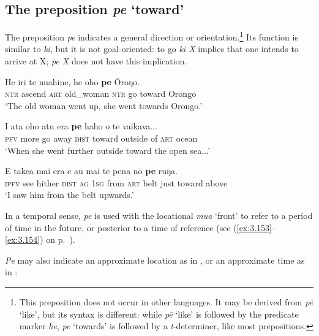 \subsection{The preposition \textit{pe} ‘toward’}\label{sec:4.7.5}

The preposition \textit{pe} indicates a general direction or orientation.\footnote{\label{fn:231}This preposition does not occur in other languages. It may be derived from \textit{pē} ‘like’, but its syntax is different: while \textit{pē} ‘like’ is followed by the predicate marker \textit{he}, \textit{pe} ‘towards’ is followed by a \textit{t}{}-determiner, like most prepositions.} Its function is similar to \textit{ki}, but it is not goal-oriented: to go \textit{ki X} implies that one intends to arrive at X; \textit{pe X} does not have this implication.

\ea\label{ex:4.273}
\gll He iri te nuahine, he oho \textbf{pe} {\ꞌ}Ōroŋo. \\
\textsc{ntr} ascend \textsc{art} old\_woman \textsc{ntr} go toward Orongo \\

\glt 
‘The old woman went up, she went towards Orongo.’ \textstyleExampleref{[Ley-8-52.028]}
\z

\ea\label{ex:4.274}
\gll I {\ꞌ}ata oho atu era \textbf{pe} haho o te vaikava... \\
\textsc{pfv} more go away \textsc{dist} toward outside of \textsc{art} ocean \\

\glt 
‘When she went further outside toward the open sea...’ \textstyleExampleref{[R338.006]} 
\z

\ea\label{ex:4.275}
\gll E take{\ꞌ}a mai era e au mai te pena nō \textbf{pe} ruŋa. \\
\textsc{ipfv} see hither \textsc{dist} \textsc{ag} \textsc{1sg} from \textsc{art} belt just toward above \\

\glt
‘I saw him from the belt upwards.’ \textstyleExampleref{[R106.034]} 
\z

In a temporal sense, \textit{pe} is used with the locational \textit{mu{\ꞌ}a} ‘front’ to refer to a period of time in the future, or posterior to a time of reference (see (\ref{ex:3.153}–\ref{ex:3.154}) on p.~\pageref{ex:3.153}). 

\textit{Pe} may also indicate an approximate location as in , or an approximate time as in :

